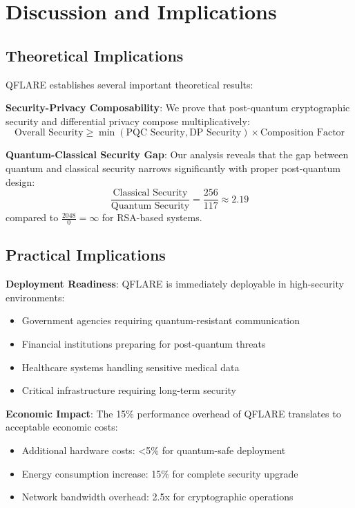 \documentclass[journal,onecolumn,draftclsnofoot]{IEEEtran}
\begin{document}
\section{Discussion and Implications}

\subsection{Theoretical Implications}

QFLARE establishes several important theoretical results:

\textbf{Security-Privacy Composability}: We prove that post-quantum cryptographic security and differential privacy compose multiplicatively:
$$\text{Overall Security} \geq \min(\text{PQC Security}, \text{DP Security}) \times \text{Composition Factor}$$

\textbf{Quantum-Classical Security Gap}: Our analysis reveals that the gap between quantum and classical security narrows significantly with proper post-quantum design:
$$\frac{\text{Classical Security}}{\text{Quantum Security}} = \frac{256}{117} \approx 2.19$$
compared to $\frac{2048}{0} = \infty$ for RSA-based systems.

\subsection{Practical Implications}

\textbf{Deployment Readiness}: QFLARE is immediately deployable in high-security environments:
\begin{itemize}
\item Government agencies requiring quantum-resistant communication
\item Financial institutions preparing for post-quantum threats
\item Healthcare systems handling sensitive medical data
\item Critical infrastructure requiring long-term security
\end{itemize}

\textbf{Economic Impact}: The 15\% performance overhead of QFLARE translates to acceptable economic costs:
\begin{itemize}
\item Additional hardware costs: <5\% for quantum-safe deployment
\item Energy consumption increase: 15\% for complete security upgrade
\item Network bandwidth overhead: 2.5x for cryptographic operations
\end{itemize}
\end{document}
